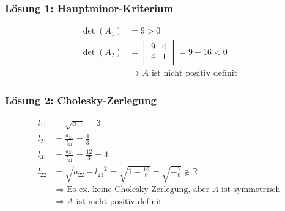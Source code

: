 \subsubsection*{Lösung 1: Hauptminor-Kriterium}

\begin{align}
	\det(A_1) &= 9 > 0\\
	\det(A_2) &= 
		\begin{vmatrix}
			9 & 4 \\
			4 & 1 \\
		\end{vmatrix} = 9 - 16 < 0\\
	&\Rightarrow \text{$A$ ist nicht positiv definit}
\end{align}

\subsubsection*{Lösung 2: Cholesky-Zerlegung}
\begin{align}
	l_{11} &= \sqrt{a_{11}} = 3\\
	l_{21} &= \frac{a_{21}}{l_{11}} = \frac{4}{3}\\
	l_{31} &= \frac{a_{31}}{l_{11}} = \frac{12}{3} = 4\\
	l_{22} &= \sqrt{a_{22} - {l_{21}}^2} = \sqrt{1 - \frac{16}{9}}= \sqrt{-\frac{7}{9}} \notin \mathbb{R}\\
 & \Rightarrow \text{Es ex. keine Cholesky-Zerlegung, aber $A$ ist symmetrisch}\\
 & \Rightarrow \text{$A$ ist nicht positiv definit}
\end{align}
